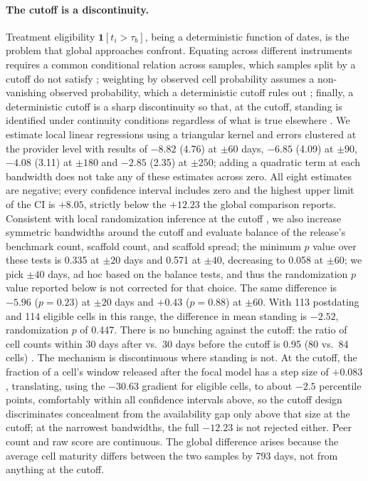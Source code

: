 \paragraph{The cutoff is a discontinuity.}
Treatment eligibility $\mathbf{1}[t_i > \tau_b]$, being a deterministic function of dates, is the problem that global approaches confront. Equating across different instruments requires a common conditional relation across samples, which samples split by a cutoff do not satisfy \citep{sinharay2010missing}; weighting by observed cell probability assumes a non-vanishing observed probability, which a deterministic cutoff rules out \citep{ma2019missing}; finally, a deterministic cutoff is a sharp discontinuity so that, at the cutoff, standing is identified under continuity conditions regardless of what is true elsewhere \citep{hahn2001identification}. We estimate local linear regressions using a triangular kernel and errors clustered at the provider level with results of $-8.82$ (4.76) at $\pm 60$ days, $-6.85$ (4.09) at $\pm 90$, $-4.08$ (3.11) at $\pm 180$ and $-2.85$ (2.35) at $\pm 250$; adding a quadratic term at each bandwidth does not take any of these estimates across zero. All eight estimates are negative; every confidence interval includes zero and the highest upper limit of the CI is $+8.05$, strictly below the $+12.23$ the global comparison reports. Consistent with local randomization inference at the cutoff \citep{cattaneo2015randomization}, we also increase symmetric bandwidths around the cutoff and evaluate balance of the release's benchmark count, scaffold count, and scaffold spread; the minimum $p$ value over these tests is 0.335 at $\pm 20$ days and 0.571 at $\pm 40$, decreasing to 0.058 at $\pm 60$; we pick $\pm 40$ days, ad hoc based on the balance tests, and thus the randomization $p$ value reported below is not corrected for that choice. The same difference is $-5.96$ ($p = 0.23$) at $\pm 20$ days and $+0.43$ ($p = 0.88$) at $\pm 60$. With 113 postdating and 114 eligible cells in this range, the difference in mean standing is $-2.52$, randomization $p$ of 0.447. There is no bunching against the cutoff: the ratio of cell counts within 30 days after vs.\ 30 days before the cutoff is 0.95 (80 vs.\ 84 cells) \citep{mccrary2008manipulation}. The mechanism is discontinuous where standing is not. At the cutoff, the fraction of a cell's window released after the focal model has a step size of $+0.083$, translating, using the $-30.63$ gradient for eligible cells, to about $-2.5$ percentile points, comfortably within all confidence intervals above, so the cutoff design discriminates concealment from the availability gap only above that size at the cutoff; at the narrowest bandwidths, the full $-12.23$ is not rejected either. Peer count and raw score are continuous. The global difference arises because the average cell maturity differs between the two samples by 793 days, not from anything at the cutoff.

